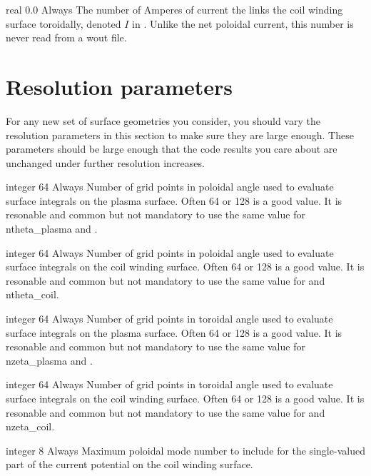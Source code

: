 \myhrule

{real}
{0.0}
{Always}
{The number of Amperes of current the links the coil winding surface toroidally,
denoted $I$ in \cite{regcoilPaper}. Unlike the net poloidal current, this number
is never read from a wout file.
}



\section{Resolution parameters}

For any new set of surface geometries you consider, you should vary the resolution parameters in this section to make sure
they are large enough.  These parameters should be large enough that the code results you care about are unchanged under further
resolution increases.

\myhrule

{integer}
{64}
{Always}
{Number of grid points in poloidal angle used to evaluate surface integrals on the plasma surface.
Often 64 or 128 is a good value.
It is resonable and common but not mandatory to use the same value for {\ttfamily ntheta\_plasma} and .}

\myhrule

{integer}
{64}
{Always}
{Number of grid points in poloidal angle used to evaluate surface integrals on the coil winding surface.
Often 64 or 128 is a good value.
It is resonable and common but not mandatory to use the same value for  and {\ttfamily ntheta\_coil}.}

\myhrule


{integer}
{64}
{Always}
{Number of grid points in toroidal angle used to evaluate surface integrals on the plasma surface.
Often 64 or 128 is a good value.
It is resonable and common but not mandatory to use the same value for {\ttfamily nzeta\_plasma} and .}

\myhrule

{integer}
{64}
{Always}
{Number of grid points in toroidal angle used to evaluate surface integrals on the coil winding surface.
Often 64 or 128 is a good value.
It is resonable and common but not mandatory to use the same value for  and {\ttfamily nzeta\_coil}.}

\myhrule

{integer}
{8}
{Always}
{Maximum poloidal mode number to include for the single-valued part of the current potential on the coil winding surface.
}

